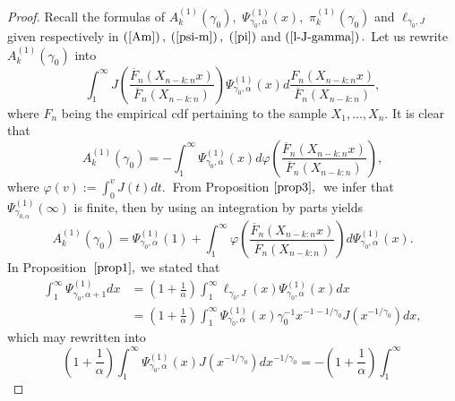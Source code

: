 \documentclass[12pt,reqno,openbib,runningheads,a4paper,portrait]{amsart}%
\begin{document}
\begin{proof}
Recall the formulas of $A_{k}^{\left(  1\right)  }\left(  \gamma_{0}\right)
,$ $\Psi_{\gamma_{0},\alpha}^{\left(  1\right)  }\left(  x\right)  ,$ $\pi
_{k}^{\left(  1\right)  }\left(  \gamma_{0}\right)  $ and $\ell_{\gamma_{0},J}
$ given respectively in $\left(  \ref{Am}\right)  ,$ $\left(  \ref{psi-m}%
\right)  ,$ $\left(  \ref{pi}\right)  $ and $\left(  \ref{l-J-gamma}\right)
.$ Let us rewrite $A_{k}^{\left(  1\right)  }\left(  \gamma_{0}\right)  $ into%
\[
\int_{1}^{\infty}J\left(  \frac{\overline{F}_{n}\left(  X_{n-k:n}x\right)
}{\overline{F}_{n}\left(  X_{n-k:n}\right)  }\right)  \Psi_{\gamma_{0},\alpha
}^{\left(  1\right)  }\left(  x\right)  d\frac{F_{n}\left(  X_{n-k:n}x\right)
}{\overline{F}_{n}\left(  X_{n-k:n}\right)  },
\]
where $F_{n}$ being the empirical cdf pertaining to the sample $X_{1}%
,...,X_{n}.$ It is clear that%
\[
A_{k}^{\left(  1\right)  }\left(  \gamma_{0}\right)  =-\int_{1}^{\infty}%
\Psi_{\gamma_{0},\alpha}^{\left(  1\right)  }\left(  x\right)  d\varphi\left(
\frac{\overline{F}_{n}\left(  X_{n-k:n}x\right)  }{\overline{F}_{n}\left(
X_{n-k:n}\right)  }\right)  ,
\]
where $\varphi\left(  v\right)  :=\int_{0}^{v}J\left(  t\right)
dt.$\textbf{\ }From Proposition $\ref{prop3},$\textbf{\ }we infer
that\textbf{\ }$\Psi_{\gamma_{0,\alpha}}^{\left(  1\right)  }\left(
\infty\right)  $ is finite, then by using an integration by parts yields%
\[
A_{k}^{\left(  1\right)  }\left(  \gamma_{0}\right)  =\Psi_{\gamma_{0},\alpha
}^{\left(  1\right)  }\left(  1\right)  +\int_{1}^{\infty}\varphi\left(
\frac{\overline{F}_{n}\left(  X_{n-k:n}x\right)  }{\overline{F}_{n}\left(
X_{n-k:n}\right)  }\right)  d\Psi_{\gamma_{0},\alpha}^{\left(  1\right)
}\left(  x\right)  .
\]
In Proposition\textbf{\ }$\ref{prop1},$ we stated that
\begin{align*}
\int_{1}^{\infty}\Psi_{\gamma_{0},\alpha+1}^{\left(  1\right)  }dx  &
=\left(  1+\frac{1}{\alpha}\right)  \int_{1}^{\infty}\ell_{\gamma_{0}%
,J}\left(  x\right)  \Psi_{\gamma_{0},\alpha}^{\left(  1\right)  }\left(
x\right)  dx\\
&  =\left(  1+\frac{1}{\alpha}\right)  \int_{1}^{\infty}\Psi_{\gamma
_{0},\alpha}^{\left(  1\right)  }\left(  x\right)  \gamma_{0}^{-1}%
x^{-1-1/\gamma_{0}}J\left(  x^{-1/\gamma_{0}}\right)  dx,
\end{align*}
which may rewritten into%
\[
\left(  1+\frac{1}{\alpha}\right)  \int_{1}^{\infty}\Psi_{\gamma_{0},\alpha
}^{\left(  1\right)  }\left(  x\right)  J\left(  x^{-1/\gamma_{0}}\right)
dx^{-1/\gamma_{0}}=-\left(  1+\frac{1}{\alpha}\right)  \int_{1}^{\infty}%
\]
\end{proof}
\end{document}
